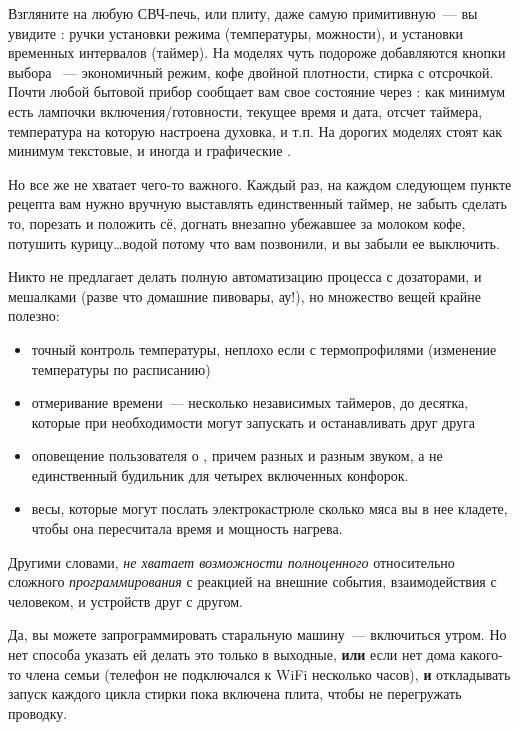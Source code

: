 Взгляните на любую СВЧ-печь, или плиту, даже самую примитивную\ --- вы увидите
: ручки установки режима
(температуры, можности), и установки временных интервалов (таймер). На моделях
чуть подороже добавляются кнопки выбора \ --- экономичный режим,
кофе двойной плотности, стирка с отсрочкой. Почти любой бытовой прибор сообщает
вам свое состояние через : как
минимум есть лампочки включения/готовности, текущее время и дата, отсчет
таймера, температура на которую настроена духовка, и т.п. На дорогих моделях
стоят как минимум текстовые, и иногда и графические .

\bigskip
Но все же не хватает чего-то важного. Каждый раз, на каждом следующем пункте
рецепта вам нужно вручную выставлять единственный таймер, не забыть сделать то,
порезать и положить сё, догнать внезапно убежавшее за молоком кофе, потушить
курицу\ldots водой потому что вам позвонили, и вы забыли ее выключить.

Никто не предлагает делать полную автоматизацию процесса с дозаторами, и
мешалками (разве что домашние пивовары, ау!), но множество вещей крайне полезно:
\begin{itemize}[nosep]
  \item точный контроль температуры, неплохо если с термопрофилями (изменение
  температуры по расписанию)
  \item отмеривание времени\ --- несколько независимых таймеров, до десятка,
  которые при необходимости могут запускать и останавливать друг друга
  \item оповещение пользователя о , причем разных и разным
  звуком, а не единственный будильник для четырех включенных конфорок.
  \item весы, которые могут послать электрокастрюле сколько мяса вы в нее
  кладете, чтобы она пересчитала время и мощность нагрева.
\end{itemize}

\medskip\noindent
Другими словами, \emph{не хватает возможности полноценного} относительно
сложного \emph{программирования} с реакцией на внешние события, взаимодействия с
человеком, и устройств друг с другом.

Да, вы можете запрограммировать старальную машину\ --- включиться утром. Но нет
способа указать ей делать это только в выходные, \textbf{или} если нет дома
какого-то члена семьи (телефон не подключался к WiFi несколько часов),
\textbf{и} откладывать запуск каждого цикла стирки пока включена плита, чтобы не
перегружать проводку.

